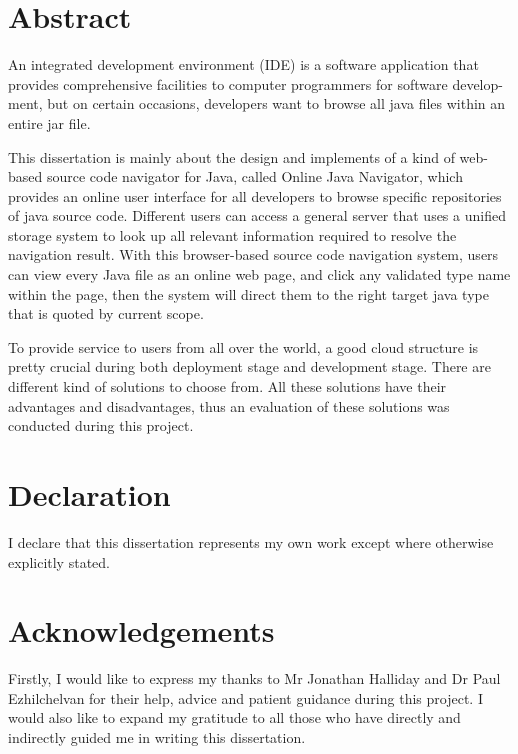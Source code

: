 \documentclass[runningheads]{llncs}
\begin{document}
\newpage
{}
\setcounter{page}{2}
\section*{Abstract}

An integrated development environment (IDE) is a software application that provides comprehensive facilities to computer programmers for software develop-ment\cite{Integrated_development_environment}, but on certain occasions, developers want to browse all java files within an entire jar file.

This dissertation is mainly about the design and implements of a kind of web-based source code navigator for Java, called Online Java Navigator, which provides an online user interface for all developers to browse specific repositories of java source code. Different users can access a general server that uses a unified storage system to look up all relevant information required to resolve the navigation result. With this browser-based source code navigation system, users can view every Java file as an online web page, and click any validated type name within the page, then the system will direct them to the right target java type that is quoted by current scope.

To provide service to users from all over the world, a good cloud structure is pretty crucial during both deployment stage and development stage. There are different kind of solutions to choose from. All these solutions have their advantages and disadvantages, thus an evaluation of these solutions was conducted during this project.

\section*{Declaration}

I declare that this dissertation represents my own work except where otherwise explicitly stated.

\newpage
\section*{Acknowledgements}

Firstly, I would like to express my thanks to Mr Jonathan Halliday and Dr Paul Ezhilchelvan for their help, advice and patient guidance during this project. I would also like to expand my gratitude to all those who have directly and indirectly guided me in writing this dissertation.
\end{document}

